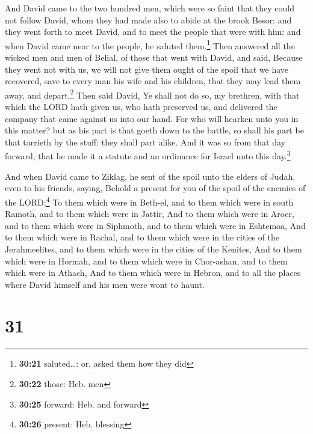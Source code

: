 And David came to the two hundred men, which were so
faint that they could not follow David, whom they had made also to abide
at the brook Besor: and they went forth to meet David, and to meet the
people that were with him: and when David came near to the people, he
saluted them.\footnote{\textbf{30:21} saluted\ldots: or, asked them how
  they did}  Then answered all the wicked men and men of
Belial, of those that went with David, and said, Because they went not
with us, we will not give them ought of the spoil that we have
recovered, save to every man his wife and his children, that they may
lead them away, and depart.\footnote{\textbf{30:22} those: Heb. men}
 Then said David, Ye shall not do so, my brethren, with
that which the LORD hath given us, who hath preserved us, and delivered
the company that came against us into our hand.  For who
will hearken unto you in this matter? but as his part is that goeth down
to the battle, so shall his part be that tarrieth by the stuff: they
shall part alike.  And it was so from that day forward,
that he made it a statute and an ordinance for Israel unto this
day.\footnote{\textbf{30:25} forward: Heb. and forward}

 And when David came to Ziklag, he sent of the spoil unto
the elders of Judah, even to his friends, saying, Behold a present for
you of the spoil of the enemies of the LORD;\footnote{\textbf{30:26}
  present: Heb. blessing}  To them which were in Beth-el,
and to them which were in south Ramoth, and to them which were in
Jattir,  And to them which were in Aroer, and to them
which were in Siphmoth, and to them which were in Eshtemoa,
 And to them which were in Rachal, and to them which were
in the cities of the Jerahmeelites, and to them which were in the cities
of the Kenites,  And to them which were in Hormah, and to
them which were in Chor-ashan, and to them which were in Athach,
 And to them which were in Hebron, and to all the places
where David himself and his men were wont to haunt.

\hypertarget{section-30}{%
\section{31}\label{section-30}}

